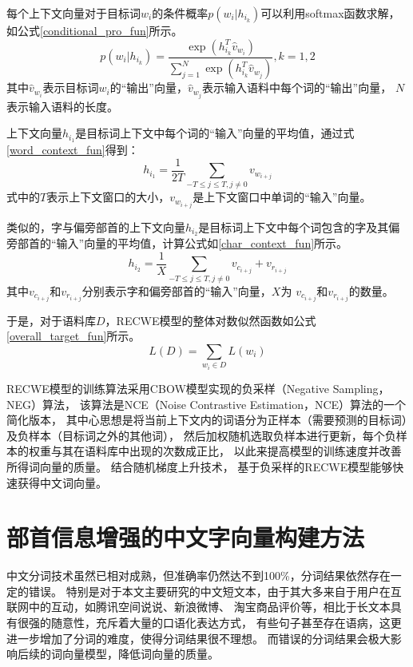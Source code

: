 每个上下文向量对于目标词$w_i$的条件概率$p\left( w_i|h_{i_k}\right )$可以利用softmax函数求解，
如公式\ref{conditional_pro_fun}所示。
\begin{equation}
    p\left ( w_i | h_{i_k} \right )=\frac{\exp \left ( h_{i_k}^{T}\hat{v}_{w_i} \right )}{\sum_{j=1}^{N}\exp \left ( h_{i_k}^{T}\hat{v}_{w_j} \right )},k=1,2
    \label{conditional_pro_fun}
\end{equation}
其中$\hat{v}_{w_i}$表示目标词$w_i$的“输出”向量，$\hat{v}_{w_j}$表示输入语料中每个词的“输出”向量，
$N$表示输入语料的长度。

上下文向量$h_{i_1}$是目标词上下文中每个词的“输入”向量的平均值，通过式\ref{word_context_fun}得到：
\begin{equation}
    h_{i_1}=\frac{1}{2T}\sum_{-T\leq j\leq T,j\neq 0}v_{w_{i+j}}
    \label{word_context_fun}
\end{equation}
式中的$T$表示上下文窗口的大小，$v_{w_{i+j}}$是上下文窗口中单词的“输入”向量。

类似的，字与偏旁部首的上下文向量$h_{i_2}$是目标词上下文中每个词包含的字及其偏旁部首的“输入”向量的平均值，计算公式如\ref{char_context_fun}所示。
\begin{equation}
    h_{i_2}=\frac{1}{X}\sum_{-T\leq j\leq T,j\neq 0} v_{c_{i+j}}+v_{r_{i+j}}
    \label{char_context_fun}
\end{equation}
其中$v_{c_{i+j}}$和$v_{r_{i+j}}$分别表示字和偏旁部首的“输入”向量，$X$为
$v_{c_{i+j}}$和$v_{r_{i+j}}$的数量。

于是，对于语料库$D$，RECWE模型的整体对数似然函数如公式\ref{overall_target_fun}所示。
\begin{equation}
    L\left ( D \right )=\sum_{w_i \in D}L\left ( w_i \right )
    \label{overall_target_fun}
\end{equation}

RECWE模型的训练算法采用CBOW模型实现的负采样（Negative Sampling，NEG）算法，
该算法是NCE（Noise Contrastive Estimation，NCE）算法的一个简化版本，
其中心思想是将当前上下文内的词语分为正样本（需要预测的目标词）及负样本（目标词之外的其他词），
然后加权随机选取负样本进行更新，每个负样本的权重与其在语料库中出现的次数成正比，
以此来提高模型的训练速度并改善所得词向量的质量。
结合随机梯度上升技术，
基于负采样的RECWE模型能够快速获得中文词向量。




\section{部首信息增强的中文字向量构建方法}
中文分词技术虽然已相对成熟，但准确率仍然达不到100\%，分词结果依然存在一定的错误。
特别是对于本文主要研究的中文短文本，由于其大多来自于用户在互联网中的互动，如腾讯空间说说、新浪微博、
淘宝商品评价等，相比于长文本具有很强的随意性，充斥着大量的口语化表达方式，
有些句子甚至存在语病，这更进一步增加了分词的难度，使得分词结果很不理想。
而错误的分词结果会极大影响后续的词向量模型，降低词向量的质量。

